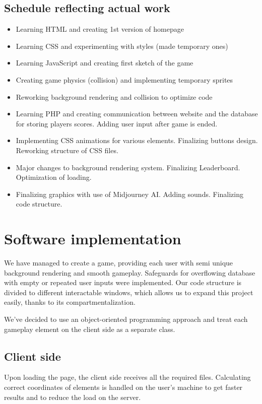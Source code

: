 \documentclass[oneside,a4paper,11pt]{report}
\begin{document}
\section{Schedule reflecting actual work}
\begin{itemize}
	\item Learning HTML and creating 1st version of homepage
	\item Learning CSS and experimenting with styles (made temporary ones)
	\item Learning JavaScript and creating first sketch of the game
	\item Creating game physics (collision) and implementing temporary sprites
	\item Reworking background rendering and collision to optimize code
	\item Learning PHP and creating communication between website and the database for storing players scores. Adding user input after game is ended.
	\item Implementing CSS animations for various elements. Finalizing buttons design. Reworking structure of CSS files.
	\item Major changes to background rendering system. Finalizing Leaderboard. Optimization of loading.
	\item Finalizing graphics with use of Midjourney AI. Adding sounds. Finalizing code structure.
\end{itemize}


\chapter{Software implementation}

We have managed to create a game, providing each user with semi unique background rendering and smooth gameplay.
Safeguards for overflowing database with empty or repeated user inputs were implemented.
Our code structure is divided to different interactable windows, which allows us to expand this project easily, thanks to its compartmentalization.

\par
We've decided to use an object-oriented programming approach and treat each gameplay element on the client side as a separate class.

\section{Client side}

Upon loading the page, the client side receives all the required files. Calculating correct coordinates of elements is handled on the user's machine to get faster results and to reduce the load on the server.
\end{document}
